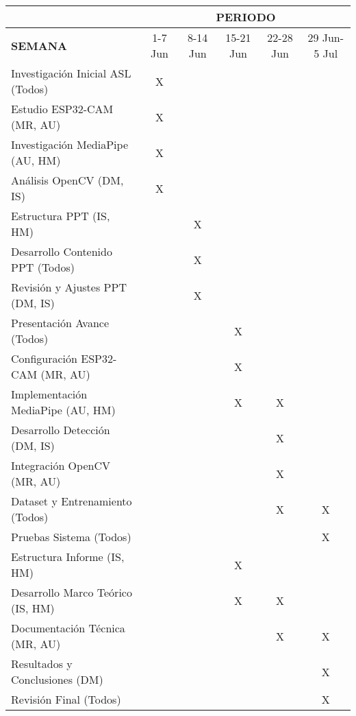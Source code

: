 \documentclass[a4paper,12pt]{article}
\begin{document}
\begin{table}[h]
\centering
\small
\begin{tabular}{|p{5cm}|*{5}{c|}}
\hline
\rowcolor{headercolor}
\multicolumn{1}{|c|}{\textbf{ACTIVIDADES}} & \multicolumn{5}{c|}{\textbf{PERIODO}} \\
\hline
\rowcolor{headercolor}
\textbf{SEMANA} & 1-7 Jun & 8-14 Jun & 15-21 Jun & 22-28 Jun & 29 Jun-5 Jul \\
\hline

\rowcolor{fase1} Investigación Inicial ASL (Todos) & X & & & & \\
\hline
\rowcolor{fase1} Estudio ESP32-CAM (MR, AU) & X & & & & \\
\hline
\rowcolor{fase1} Investigación MediaPipe (AU, HM) & X & & & & \\
\hline
\rowcolor{fase1} Análisis OpenCV (DM, IS) & X & & & & \\
\hline

\rowcolor{fase2} Estructura PPT (IS, HM) & & X & & & \\
\hline
\rowcolor{fase2} Desarrollo Contenido PPT (Todos) & & X & & & \\
\hline
\rowcolor{fase2} Revisión y Ajustes PPT (DM, IS) & & X & & & \\
\hline
\rowcolor{fase2} Presentación Avance (Todos) & & & X & & \\
\hline

\rowcolor{fase3} Configuración ESP32-CAM (MR, AU) & & & X & & \\
\hline
\rowcolor{fase3} Implementación MediaPipe (AU, HM) & & & X & X & \\
\hline
\rowcolor{fase3} Desarrollo Detección (DM, IS) & & & & X & \\
\hline
\rowcolor{fase3} Integración OpenCV (MR, AU) & & & & X & \\
\hline
\rowcolor{fase3} Dataset y Entrenamiento (Todos) & & & & X & X \\
\hline
\rowcolor{fase3} Pruebas Sistema (Todos) & & & & & X \\
\hline

\rowcolor{fase4} Estructura Informe (IS, HM) & & & X & & \\
\hline
\rowcolor{fase4} Desarrollo Marco Teórico (IS, HM) & & & X & X & \\
\hline
\rowcolor{fase4} Documentación Técnica (MR, AU) & & & & X & X \\
\hline
\rowcolor{fase4} Resultados y Conclusiones (DM) & & & & & X \\
\hline
\rowcolor{fase4} Revisión Final (Todos) & & & & & X \\
\hline
\end{tabular}
\end{table}
\end{document}
